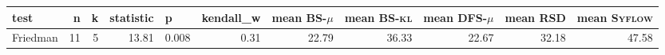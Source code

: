 \begin{tabular}{lrrrlrrrrrr}
\toprule
    test &  n &  k &  statistic &     p &  kendall\_w &  mean \textsc{BS-$\mu$} &  mean \textsc{BS-kl} &  mean \textsc{DFS-$\mu$} &  mean \textsc{RSD} &  mean \textsc{Syflow} \\
\midrule
Friedman & 11 &  5 &      13.81 & 0.008 &        0.31 &                   22.79 &                36.33 &                    22.67 &              32.18 &                 47.58 \\
\bottomrule
\end{tabular}
